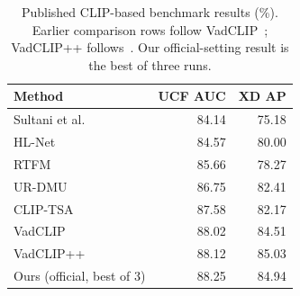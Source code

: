 \begin{table}[t]
\centering
\caption{Published CLIP-based benchmark results (\%). Earlier comparison rows follow VadCLIP~\cite{wu2024vadclip}; VadCLIP++ follows~\cite{liu2026vadclippp}. Our official-setting result is the best of three runs.}
\label{tab:benchmark}
\small\setlength{\tabcolsep}{5pt}
\begin{tabular}{lrr}\toprule
Method & UCF AUC & XD AP \\\midrule
Sultani et al.~\cite{sultani2018real} & 84.14 & 75.18 \\
HL-Net~\cite{wu2020xdviolence} & 84.57 & 80.00 \\
RTFM~\cite{tian2021rtfm} & 85.66 & 78.27 \\
UR-DMU~\cite{zhou2023urdmu} & 86.75 & 82.41 \\
CLIP-TSA~\cite{joo2023cliptsa} & 87.58 & 82.17 \\
VadCLIP~\cite{wu2024vadclip} & 88.02 & 84.51 \\
VadCLIP++~\cite{liu2026vadclippp} & 88.12 & 85.03 \\
\midrule
Ours (official, best of 3) & 88.25 & 84.94 \\
\bottomrule\end{tabular}\end{table}
